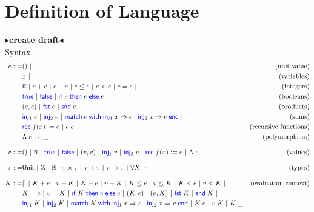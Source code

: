 \documentclass[twoside,11pt,openright]{report}
\newcommand{\BNFdef}{::=}
\newcommand{\ALT}{~|~}
\newcommand{\Keyword}[1]{{\color{blue} \mathsf{#1}}}
\newcommand{\var}{x}
\newcommand{\expr}{e}
\newcommand{\val}{v}
\newcommand{\TT}{()}
\newcommand{\Num}[1]{\overline{#1}}
\newcommand{\True}{\Keyword{true}}
\newcommand{\False}{\Keyword{false}}
\newcommand{\IfCmd}{\Keyword{if}}
\newcommand{\ThenCmd}{\Keyword{then}}
\newcommand{\ElseCmd}{\Keyword{else}}
\def\If#1then#2else#3{\IfCmd{}\;#1\;\ThenCmd{}\;#2\;\ElseCmd{}\;#3}
\newcommand{\Fst}{\Keyword{fst}\;}
\newcommand{\Snd}{\Keyword{snd}\;}
\newcommand{\Inj}[1]{\Keyword{inj}_{#1}\;}
\newcommand{\MatchCmd}{\Keyword{match}}
\newcommand{\WithCmd}{\Keyword{with}}
\newcommand{\EndCmd}{\Keyword{end}}
\def\Match#1with#2=>#3|#4=>#5end{\MatchCmd{}\;#1\;\WithCmd{}\;#2\Rightarrow#3 \;|\;#4\Rightarrow#5\;\EndCmd{}}
\newcommand{\Tvar}{X}
\newcommand{\Tlam}{\Lambda\;}
\newcommand{\Tapp}[1]{#1\;\_}
\newcommand{\empelctx}{[]}
\newcommand{\elctx}{K}
\newcommand{\Tunit}{\mathsf{Unit}}
\newcommand{\Tint}{\mathbb{Z}}
\newcommand{\Tbool}{\mathbb{B}}
\newcommand{\Tprod}[2]{#1 \times #2}
\newcommand{\Tsum}[2]{#1 + #2}
\newcommand{\Tfunc}[2]{#1 \rightarrow #2}
\newcommand{\Tall}[2]{\forall #1.\; #2}
\newcommand{\typ}{\tau}
\newcommand{\todo}[1]{{\color[rgb]{.5,0,0}\textbf{$\blacktriangleright$#1$\blacktriangleleft$}}}
\begin{document}
\chapter{Definition of Language}
\label{ch:DoL}

\todo{create draft}\\
Syntax
\begin{align*}
  \expr \BNFdef & \TT \ALT & \text{(unit value)}\\
                & \var \ALT & \text{(variables)}\\
                & \Num{n} \ALT \expr + \expr \ALT \expr - \expr \ALT
                  \expr \le \expr \ALT \expr < \expr \ALT 
                  \expr = \expr \ALT & \text{(integers)}\\
                & \True \ALT \False \ALT {\If \expr then \expr else \expr} \ALT
                  & \text{(booleans)}\\
                & (\expr, \expr) \ALT \Fst \expr \ALT \Snd \expr \ALT
                  & \text{(products)}\\
                & \Inj{1} \expr \ALT \Inj{2} \expr \ALT 
                  \Match \expr with \Inj{1} \var => \expr | \Inj{2} \var => \expr end \ALT
                  & \text{(sums)}\\
                & \Rec f \var := \expr \ALT \expr \; \expr
                  & \text{(recursive functions)}\\
                & \Tlam \expr \ALT \Tapp{\expr} & \text{(polymorphism)}\\[8pt]
  \val \BNFdef  & \TT \ALT \Num{n} \ALT \True \ALT \False \ALT
                  (\val, \val) \ALT \Inj{1} \val \ALT \Inj{2} \val \ALT
                  \Rec f \var := \expr \ALT \Tlam \expr
                  & \text{(values)}\\[8pt]
  \typ \BNFdef  & \Tunit \ALT \Tint \ALT \Tbool \ALT {\Tprod \typ \typ} \ALT
                  {\Tsum \typ \typ} \ALT {\Tfunc \typ \typ} \ALT 
                  {\Tall \Tvar \typ} & \text{(types)}\\[8pt]
  \elctx \BNFdef& \empelctx \ALT 
                  \elctx + \expr \ALT \val + \elctx \ALT
                  \elctx - \expr \ALT \val - \elctx \ALT
                  \elctx \le \expr \ALT \val \le \elctx \ALT
                  \elctx < \expr \ALT \val < \elctx \ALT 
                  & \text{(evaluation context)}\\
                & \elctx = \expr \ALT \val = \elctx \ALT
                  {\If \elctx then \expr else \expr} \ALT
                  (\elctx, \expr) \ALT (\val, \elctx) \ALT
                  \Fst \elctx \ALT \Snd \elctx \ALT\\
                & \Inj{1} \elctx \ALT \Inj{2} \elctx \ALT
                  \Match \elctx with \Inj{1} \var => \expr | \Inj{2} \var => \expr end \ALT
                  \elctx \; \expr \ALT \val \; \elctx \ALT \Tapp{\elctx}
\end{align*}
\end{document}
